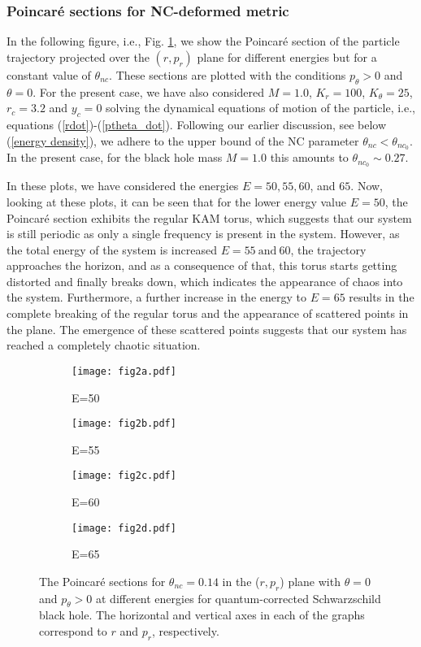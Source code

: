 \documentclass[aps,prd,showpacs,nofootinbib,floats,floatfix,preprintnumbers,groupedaddress,twocolumn]{revtex4-1}
\begin{document}
\subsubsection{Poincar\'e sections for NC-deformed metric}
%
%
%
\par\noindent
In the following figure, i.e., Fig. \ref{fig:2}, we show the Poincar\'e section of the particle trajectory projected over the $(r,p_r)$ plane for different energies but for a constant value of $\theta_{nc}$. These sections are plotted with the conditions $p_{\theta}>0$ and $\theta=0$. For the present case, we have also considered $M=1.0$, $K_{r}=100$, $K_{\theta}=25$, $r_{c}=3.2$ and $y_{c}=0$ solving the dynamical equations of motion of the particle, i.e., equations (\ref{rdot})-(\ref{ptheta_dot}). Following our earlier discussion, see  below  (\ref{energy density}), we adhere to the upper bound of the NC parameter $\theta_{nc}<\theta_{{nc}_0}$. In the present case, for the black hole mass $M=1.0$ this amounts to $\theta_{{nc}_0}\sim 0.27$.
%
%
%
%
\par\noindent
In these plots,  we have considered the energies $E=50, 55, 60$, and $65$. Now, looking  at these plots, it can be seen that for the lower energy value $E=50$, the Poincar\'e section exhibits the regular KAM torus, which suggests that our system is still periodic as only a single frequency is present in the system. However, as the total energy of the system is increased  $E=55~\text{and}~60$, the trajectory approaches  the horizon, and as a consequence of that, this torus starts getting distorted and finally breaks down, which indicates the appearance of chaos into the system. Furthermore, a further increase in the energy to $E=65$ results in the complete breaking of the regular torus and the appearance of scattered points in the plane. The emergence of these scattered points suggests that our system has reached a completely chaotic situation.
%
%
%
\begin{figure}[hbt!]
	\centering
	\begin{subfigure}[b]{0.4\linewidth}
		\texttt{[image: fig2a.pdf]}
		\caption{E=50}
	\end{subfigure}
	\begin{subfigure}[b]{0.4\linewidth}
		\texttt{[image: fig2b.pdf]}
		\caption{E=55}
	\end{subfigure}
	\begin{subfigure}[b]{0.4\linewidth}
		\texttt{[image: fig2c.pdf]}
		\caption{E=60}
	\end{subfigure}
	\begin{subfigure}[b]{0.4\linewidth}
		\texttt{[image: fig2d.pdf]}
		\caption{E=65}
	\end{subfigure}
	\caption{The Poincar\'e sections for $\theta_{nc} = 0.14$ in the ($r,p_r$) plane with $\theta = 0$ and $p_\theta > 0$ at different energies for quantum-corrected Schwarzschild black hole. The horizontal and vertical axes in each of the graphs correspond to $r$ and $p_r$, respectively.}
	\label{fig:2}
\end{figure}
\end{document}
